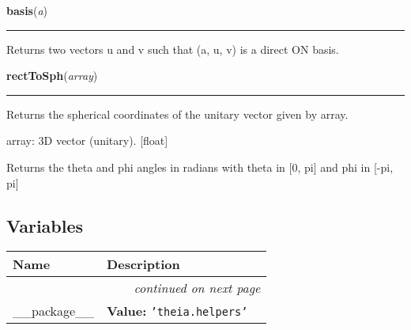     \vspace{0.5ex}

\hspace{.8\funcindent}\begin{boxedminipage}{\funcwidth}

    \raggedright \textbf{basis}(\textit{a})

    \vspace{-1.5ex}

    \rule{\textwidth}{0.5\fboxrule}
\setlength{\parskip}{2ex}
    Returns two vectors u and v such that (a, u, v) is a direct ON basis.

\setlength{\parskip}{1ex}
    \end{boxedminipage}

    \label{theia:helpers:geometry:rectToSph}

    \vspace{0.5ex}

\hspace{.8\funcindent}\begin{boxedminipage}{\funcwidth}

    \raggedright \textbf{rectToSph}(\textit{array})

    \vspace{-1.5ex}

    \rule{\textwidth}{0.5\fboxrule}
\setlength{\parskip}{2ex}
    Returns the spherical coordinates of the unitary vector given by array.

    array: 3D vector (unitary). [float]

    Returns the theta and phi angles in radians with theta in [0, pi] and 
    phi in [-pi, pi]

\setlength{\parskip}{1ex}
    \end{boxedminipage}



  \subsection{Variables}

    \vspace{-1cm}
\hspace{\varindent}\begin{longtable}{|p{\varnamewidth}|p{\vardescrwidth}|l}
\cline{1-2}
\cline{1-2} \centering \textbf{Name} & \centering \textbf{Description}& \\
\cline{1-2}
\endhead\cline{1-2}\multicolumn{3}{r}{\small\textit{continued on next page}}\\\endfoot\cline{1-2}
\endlastfoot\raggedright \_\-\_\-p\-a\-c\-k\-a\-g\-e\-\_\-\_\- & \raggedright \textbf{Value:} 
{\tt \texttt{'}\texttt{theia.helpers}\texttt{'}}&\\
\cline{1-2}
\end{longtable}


